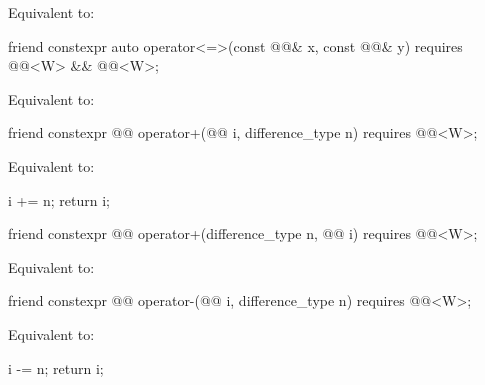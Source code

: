 \begin{itemdescr}
\pnum
\effects
Equivalent to: 
\end{itemdescr}

\begin{itemdecl}
friend constexpr auto operator<=>(const @@& x, const @@& y)
  requires @@<W> && @@<W>;
\end{itemdecl}

\begin{itemdescr}
\pnum
\effects
Equivalent to: 
\end{itemdescr}

\begin{itemdecl}
friend constexpr @@ operator+(@@ i, difference_type n)
  requires @@<W>;
\end{itemdecl}

\begin{itemdescr}
\pnum
\effects
Equivalent to:
\begin{codeblock}
i += n;
return i;
\end{codeblock}
\end{itemdescr}

\begin{itemdecl}
friend constexpr @@ operator+(difference_type n, @@ i)
  requires @@<W>;
\end{itemdecl}

\begin{itemdescr}
\pnum
\effects
Equivalent to: 
\end{itemdescr}

\begin{itemdecl}
friend constexpr @@ operator-(@@ i, difference_type n)
  requires @@<W>;
\end{itemdecl}

\begin{itemdescr}
\pnum
\effects
Equivalent to:
\begin{codeblock}
i -= n;
return i;
\end{codeblock}
\end{itemdescr}

